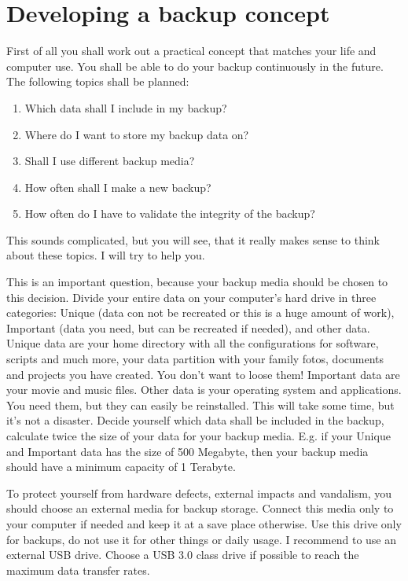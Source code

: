\section{Developing a backup concept}
First of all you shall work out a practical concept that matches your life and
computer use. You shall be able to do your backup continuously in the future.
The following topics shall be planned:
\begin{enumerate}
\item Which data shall I include in my backup?
\item Where do I want to store my backup data on?
\item Shall I use different backup media?
\item How often shall I make a new backup?
\item How often do I have to validate the integrity of the backup?
\end{enumerate}
This sounds complicated, but you will see, that it really makes sense to think about
these topics. I will try to help you.

This is an important question, because your backup media should be chosen to this
decision. Divide your entire data on your computer's hard drive in three categories:
Unique (data con not be recreated or this is a huge amount of work), Important (data
you need, but can be recreated if needed), and other data.
Unique data are your home directory with all the configurations for software, scripts
and much more, your data partition with your family fotos, documents and projects you
have created. You don't want to loose them!
Important data are your movie and music files.
Other data is your operating system and applications. You need them, but they can easily
be reinstalled. This will take some time, but it's not a disaster.
Decide yourself which data shall be included in the backup, calculate twice the
size of your data for your backup media. E.g. if your Unique and Important data has the
size of 500 Megabyte, then your backup media should have a minimum capacity of 1 Terabyte.

To protect yourself from hardware defects, external impacts and vandalism, you should
choose an external media for backup storage. Connect this media only to your computer
if needed and keep it at a save place otherwise. Use this drive only for backups,
do not use it for other things or daily usage. I recommend to use an external USB
drive. Choose a USB 3.0 class drive if possible to reach the maximum data transfer rates.

